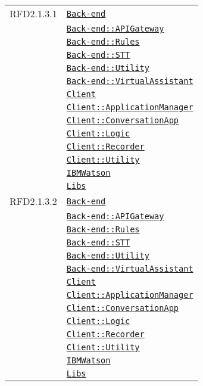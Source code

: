 \begin{longtable}{|>{\centering}m{3cm}|m{10cm}<{\centering}|}
RFD2.1.3.1 & \hyperref[Back-end]{\texttt{Back-end}}\\
& \hyperref[Back-end::APIGateway]{\texttt{Back-end::APIGateway}}\\
& \hyperref[Back-end::Rules]{\texttt{Back-end::Rules}}\\
& \hyperref[Back-end::STT]{\texttt{Back-end::STT}}\\
& \hyperref[Back-end::Utility]{\texttt{Back-end::Utility}}\\
& \hyperref[Back-end::VirtualAssistant]{\texttt{Back-end::VirtualAssistant}}\\
& \hyperref[Client]{\texttt{Client}}\\
& \hyperref[Client::ApplicationManager]{\texttt{Client::ApplicationManager}}\\
& \hyperref[Client::ConversationApp]{\texttt{Client::ConversationApp}}\\
& \hyperref[Client::Logic]{\texttt{Client::Logic}}\\
& \hyperref[Client::Recorder]{\texttt{Client::Recorder}}\\
& \hyperref[Client::Utility]{\texttt{Client::Utility}}\\
& \hyperref[IBMWatson]{\texttt{IBMWatson}}\\
& \hyperref[Libs]{\texttt{Libs}}\\ \hline

RFD2.1.3.2 & \hyperref[Back-end]{\texttt{Back-end}}\\
& \hyperref[Back-end::APIGateway]{\texttt{Back-end::APIGateway}}\\
& \hyperref[Back-end::Rules]{\texttt{Back-end::Rules}}\\
& \hyperref[Back-end::STT]{\texttt{Back-end::STT}}\\
& \hyperref[Back-end::Utility]{\texttt{Back-end::Utility}}\\
& \hyperref[Back-end::VirtualAssistant]{\texttt{Back-end::VirtualAssistant}}\\
& \hyperref[Client]{\texttt{Client}}\\
& \hyperref[Client::ApplicationManager]{\texttt{Client::ApplicationManager}}\\
& \hyperref[Client::ConversationApp]{\texttt{Client::ConversationApp}}\\
& \hyperref[Client::Logic]{\texttt{Client::Logic}}\\
& \hyperref[Client::Recorder]{\texttt{Client::Recorder}}\\
& \hyperref[Client::Utility]{\texttt{Client::Utility}}\\
& \hyperref[IBMWatson]{\texttt{IBMWatson}}\\
& \hyperref[Libs]{\texttt{Libs}}\\ \hline


\end{longtable}
